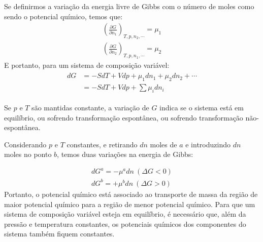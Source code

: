 \begin{multicols*}{2}
  \begin{theorem}
    Se definirmos a variação da energia livre de Gibbs com o número de moles como sendo o potencial químico, temos que:
    \begin{gather}
      \left( \frac{\partial G}{\partial n_1}  \right)_{T, p, n_2, \cdots} = \mu_1 \\
      \left( \frac{\partial G}{\partial n_2}  \right)_{T, p, n_1, \cdots} = \mu_2
    \end{gather}
    E portanto, para um sistema de composição variável:
    \begin{gather}
      \begin{align}
        dG &= -SdT + Vdp + \mu_1 dn_1 + \mu_2 dn_2 + \cdots \\
           &= -SdT + Vdp + \sum \mu_i dn_i
      \end{align}
    \end{gather}
  \end{theorem}
  \begin{remark}
    Se $p$ e $T$ são mantidas constante, a variação de $G$ indica se o sistema está em equilíbrio, ou sofrendo transformação espontânea, ou sofrendo transformação não-espontânea.
  \end{remark}

  Considerando $p$ e $T$ constantes, e retirando $dn$ moles de $a$ e introduzindo $dn$ moles no ponto $b$, temos duas variações na energia de Gibbs:
  \begin{theorem}
    \begin{gather}
      dG^a = - \mu^a dn \ (\Delta G < 0) \\
      dG^b = + \mu^b dn \ (\Delta G > 0)
    \end{gather}
    Portanto, o potencial químico está associado ao transporte de massa da região de maior potencial químico para a região de menor potencial químico.
    Para que um sistema de composição variável esteja em equilíbrio, é necessário que, além da pressão e temperatura constantes, os potenciais químicos dos componentes do sistema também fiquem constantes.
  \end{theorem}


\end{multicols*}
